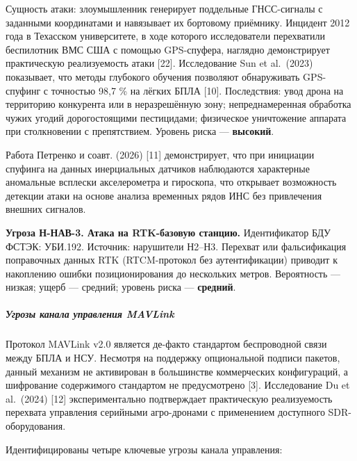 Сущность атаки: злоумышленник генерирует поддельные ГНСС-сигналы с заданными координатами и навязывает их бортовому приёмнику. Инцидент 2012 года в Техасском университете, в ходе которого исследователи перехватили беспилотник ВМС США с помощью GPS-спуфера, наглядно демонстрирует практическую реализуемость атаки {[}22{]}. Исследование Sun et al.~(2023) показывает, что методы глубокого обучения позволяют обнаруживать GPS-спуфинг с точностью 98,7 \% на лёгких БПЛА {[}10{]}. Последствия: увод дрона на территорию конкурента или в неразрешённую зону; непреднамеренная обработка чужих угодий дорогостоящими пестицидами; физическое уничтожение аппарата при столкновении с препятствием. Уровень риска --- \textbf{высокий}.

Работа Петренко и соавт. (2026) {[}11{]} демонстрирует, что при инициации спуфинга на данных инерциальных датчиков наблюдаются характерные аномальные всплески акселерометра и гироскопа, что открывает возможность детекции атаки на основе анализа временных рядов ИНС без привлечения внешних сигналов.

\textbf{Угроза Н-НАВ-3. Атака на RTK-базовую станцию.} Идентификатор БДУ ФСТЭК: УБИ.192. Источник: нарушители Н2--Н3. Перехват или фальсификация поправочных данных RTK (RTCM-протокол без аутентификации) приводит к накоплению ошибки позиционирования до нескольких метров. Вероятность --- низкая; ущерб --- средний; уровень риска --- \textbf{средний}.

\hypertarget{ux443ux433ux440ux43eux437ux44b-ux43aux430ux43dux430ux43bux430-ux443ux43fux440ux430ux432ux43bux435ux43dux438ux44f-mavlink}{%
\subparagraph{Угрозы канала управления MAVLink}\label{ux443ux433ux440ux43eux437ux44b-ux43aux430ux43dux430ux43bux430-ux443ux43fux440ux430ux432ux43bux435ux43dux438ux44f-mavlink}}

Протокол MAVLink v2.0 является де-факто стандартом беспроводной связи между БПЛА и НСУ. Несмотря на поддержку опциональной подписи пакетов, данный механизм не активирован в большинстве коммерческих конфигураций, а шифрование содержимого стандартом не предусмотрено {[}3{]}. Исследование Du et al.~(2024) {[}12{]} экспериментально подтверждает практическую реализуемость перехвата управления серийными агро-дронами с применением доступного SDR-оборудования.

Идентифицированы четыре ключевые угрозы канала управления:

